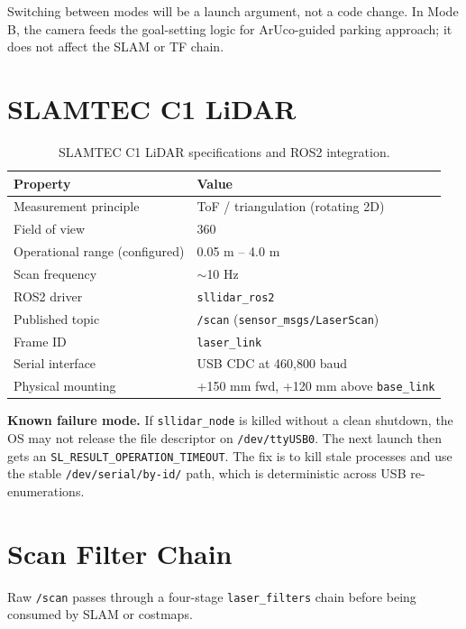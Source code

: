 \documentclass[12pt,a4paper]{report}
\begin{document}
Switching between modes will be a launch argument, not a code change. In Mode B, the camera feeds the goal-setting logic for ArUco-guided parking approach; it does not affect the SLAM or TF chain.

\section{SLAMTEC C1 LiDAR}

\begin{table}[H]
\centering
\caption{SLAMTEC C1 LiDAR specifications and ROS2 integration.}
\label{tab:lidar_specs}
\begin{tabularx}{\textwidth}{|p{4cm}|X|}
\hline
\textbf{Property} & \textbf{Value} \\
\hline
Measurement principle & ToF / triangulation (rotating 2D) \\
\hline
Field of view & 360\textdegree{} \\
\hline
Operational range (configured) & 0.05 m -- 4.0 m \\
\hline
Scan frequency & $\sim$10 Hz \\
\hline
ROS2 driver & \texttt{sllidar\_ros2} \\
\hline
Published topic & \texttt{/scan} (\texttt{sensor\_msgs/LaserScan}) \\
\hline
Frame ID & \texttt{laser\_link} \\
\hline
Serial interface & USB CDC at 460,800 baud \\
\hline
Physical mounting & +150 mm fwd, +120 mm above \texttt{base\_link} \\
\hline
\end{tabularx}
\end{table}

\textbf{Known failure mode.} If \texttt{sllidar\_node} is killed without a clean shutdown, the OS may not release the file descriptor on \texttt{/dev/ttyUSB0}. The next launch then gets an \texttt{SL\_RESULT\_OPERATION\_TIMEOUT}. The fix is to kill stale processes and use the stable \texttt{/dev/serial/by-id/} path, which is deterministic across USB re-enumerations.

\section{Scan Filter Chain}

Raw \texttt{/scan} passes through a four-stage \texttt{laser\_filters} chain before being consumed by SLAM or costmaps.
\end{document}
